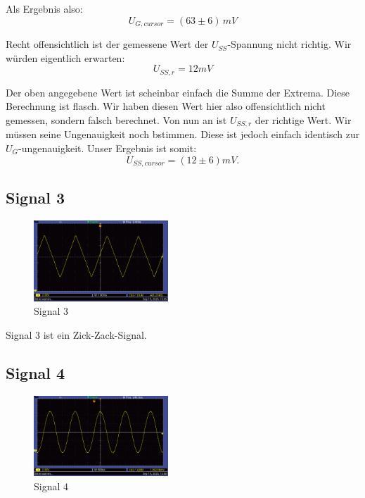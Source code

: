 Als Ergebnis also:
\begin{equation}
\boxed{
    U_{G,cursor} = (63 \pm 6) \, mV
}
\end{equation}

Recht offensichtlich ist der gemessene Wert der $U_{SS}$-Spannung nicht richtig. Wir würden eigentlich erwarten:
\begin{equation}
    U_{SS,r} = 12 mV
\end{equation}

Der oben angegebene Wert ist scheinbar einfach die Summe der Extrema. Diese Berechnung ist flasch. Wir haben diesen Wert hier also offensichtlich nicht gemessen, sondern falsch berechnet. Von nun an ist $U_{SS,r}$ der richtige Wert.
Wir müssen seine Ungenauigkeit noch bstimmen. Diese ist jedoch einfach identisch zur $U_G$-ungenauigkeit. Unser Ergebnis ist somit:
\begin{equation}
    \boxed{
        U_{SS,cursor} = (12 \pm 6) mV.
    }
\end{equation}



\newpage
\onecolumn
\twocolumn

\subsection*{Signal 3}
\begin{figure} [h!]
    \centering
        \includegraphics[width=0.45\textwidth]{img/25/Signale2/Signal3.pdf}
    \caption{Signal 3}
\end{figure}

Signal 3 ist ein Zick-Zack-Signal.

\subsection*{Signal 4}
\begin{figure} [h!]
    \centering
        \includegraphics[width=0.45\textwidth]{img/25/Signale2/Signal4.pdf}
    \caption{Signal 4}
\end{figure}

